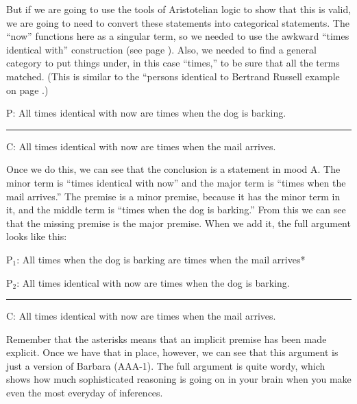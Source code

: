 But if we are going to use the tools of Aristotelian logic to show that this is valid, we are going to need to convert these statements into categorical statements. The ``now'' functions here as a singular term, so we needed to use the awkward ``times identical with'' construction (see page \pageref{subsec:singular_propositions}). Also, we needed to find a general category to put things under, in this case ``times,'' to be sure that all the terms matched. (This is similar to the ``persons identical to Bertrand Russell example on page \pageref{finding_general_terms}.) 

\begin{earg}
\item[P:] All times identical with now are times when the dog is barking.
\vspace{-.5em}
\item [] \rule{0.7\linewidth}{.5pt} 
\item[C:] All times identical with now are times when the mail arrives.
\end{earg} 

Once we do this, we can see that the conclusion is a statement in mood A. The minor term is ``times identical with now'' and the major term is ``times when the mail arrives.'' The premise is a minor premise, because it has the minor term in it, and the middle term is ``times when the dog is barking.'' From this we can see that the missing premise is the major premise. When we add it, the full argument looks like this:

\begin{earg}
\item[P$_1$:] All times when the dog is barking are times when the mail arrives*
\item[P$_2$:] All times identical with now are times when the dog is barking.
\vspace{-.5em}
\item [] \rule{0.7\linewidth}{.5pt} 
\item[C:] All times identical with now are times when the mail arrives.
\end{earg} 

Remember that the asterisks means that an implicit premise has been made explicit. Once we have that in place, however, we can see that this argument is just a version of Barbara (AAA-1). The full argument is quite wordy, which shows how much sophisticated reasoning is going on in your brain when you make even the most everyday of inferences. 

